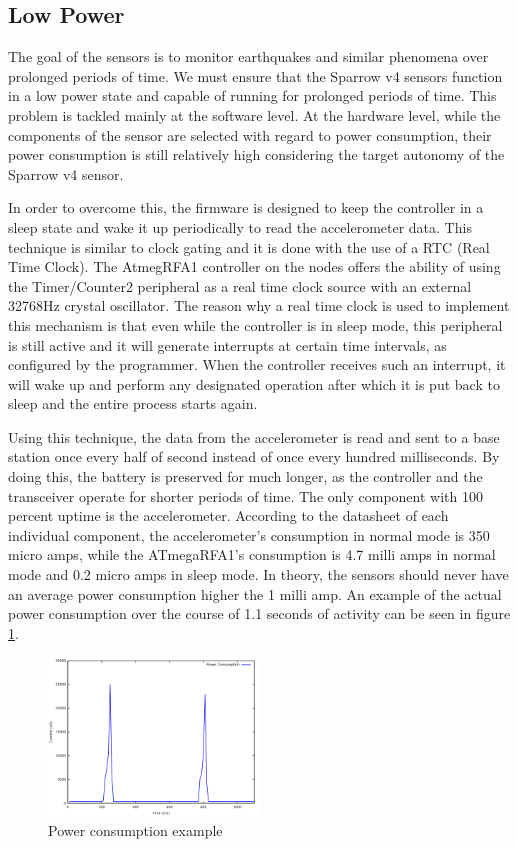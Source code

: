 \subsection{Low Power}

The goal of the sensors is to monitor earthquakes and similar phenomena over prolonged periods of time. We must ensure that the Sparrow v4 sensors function in a low power
state and capable of running for prolonged periods of time. This problem is tackled mainly at the software level. At the hardware level, while the components of the sensor 
are selected with regard to power consumption, their power consumption is still relatively high considering the target autonomy of the Sparrow v4 sensor.

In order to overcome this, the firmware is designed to keep the controller in a sleep state and wake it up periodically to read the accelerometer data. 
This technique is similar to clock gating and it is done with the use of a RTC (Real Time Clock). The AtmegRFA1 controller on the nodes offers the ability of using the Timer/Counter2 
peripheral as a real time clock source with an external 32768Hz crystal oscillator. The reason why a real time clock is used to implement this mechanism is that even while the controller 
is in sleep mode, this peripheral is still active and it will generate interrupts at certain time intervals, as configured by the programmer. When the controller receives such an 
interrupt, it will wake up and perform any designated operation after which it is put back to sleep and the entire process starts again.

Using this technique, the data from the accelerometer is read and sent to a base station once every half of second instead of once every hundred milliseconds. By doing this, 
the battery is preserved for much longer, as the controller and the transceiver operate for shorter periods of time. The only component with 100 percent uptime is the 
accelerometer. According to the datasheet of each individual component, the accelerometer's consumption in normal mode is 350 micro amps, while the ATmegaRFA1's consumption is
4.7 milli amps in normal mode and 0.2 micro amps in sleep mode. In theory, the sensors should never have  an average power consumption higher the 1 milli amp. An example of the actual power consumption over the course of 1.1 seconds of activity can be seen in figure \ref{power}.

\begin{figure}[ht] \centering
  \includegraphics[width=0.5\textwidth]{img/power-graph.png}
  \caption{Power consumption example}
  \label{power}
\end{figure}

